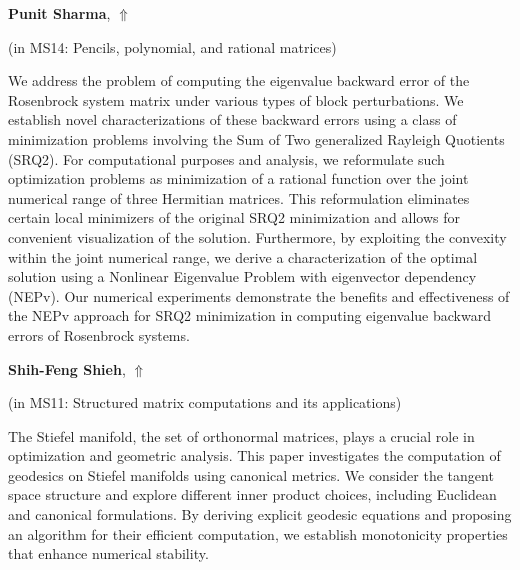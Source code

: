 \documentclass[ILAS2025-program.tex]{subfiles}
\begin{document}
\hypertarget{down0215}{}\begin{ilasabstract}
    
\textbf{Punit Sharma},  \hfill \hyperlink{up0215}{$\Uparrow$}
    
    
(in {\color{mstitle}MS14: Pencils, polynomial, and rational matrices})
        
\mtskip
    We address the problem of computing the eigenvalue backward error
of the Rosenbrock system matrix under various types of block perturbations.
We establish novel characterizations of these backward errors 
using a class of minimization problems involving the 
Sum of Two generalized Rayleigh Quotients (SRQ2). 
%
For computational purposes and analysis, we reformulate such optimization problems 
as minimization of a rational function over the
joint numerical range of three Hermitian matrices. 
%
This reformulation eliminates certain local minimizers of the
original SRQ2 minimization and allows for 
convenient visualization of the solution.
%
Furthermore, by exploiting the convexity within the joint numerical range,
we derive a characterization of the optimal solution %
using a Nonlinear Eigenvalue Problem with eigenvector dependency (NEPv).
%
Our numerical experiments demonstrate the benefits and effectiveness of 
the NEPv approach for SRQ2 minimization in computing eigenvalue backward
errors of Rosenbrock systems.
\end{ilasabstract}
    

\hypertarget{down0233}{}\begin{ilasabstract}
    
\textbf{Shih-Feng Shieh},  \hfill \hyperlink{up0233}{$\Uparrow$}
    
    
(in {\color{mstitle}MS11: Structured matrix computations and its applications})
        
\mtskip
    The Stiefel manifold, the set of orthonormal matrices, plays a crucial role in optimization and geometric analysis. This paper investigates the computation of geodesics on Stiefel manifolds using canonical metrics. We consider the tangent space structure and explore different inner product choices, including Euclidean and canonical formulations. By deriving explicit geodesic equations and proposing an algorithm for their efficient computation, we establish monotonicity properties that enhance numerical stability. 
\end{ilasabstract}
    
\end{document}

